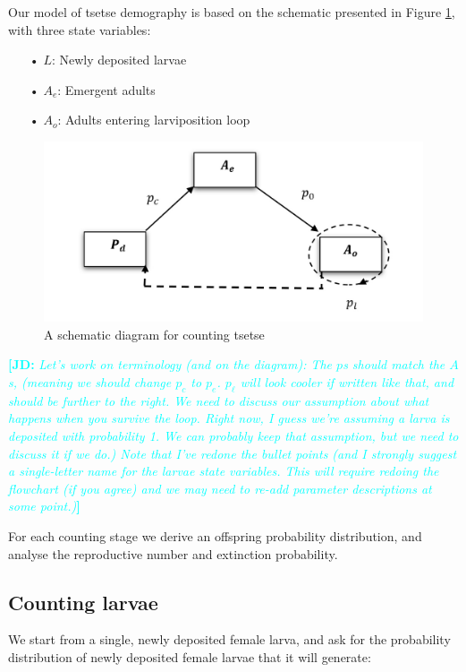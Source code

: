 \documentclass[smallextended]{svjour3}
\newcommand{\comment}[3]{\textcolor{#1}{\textbf{[#2: }\textit{#3}\textbf{]}}}
\newcommand{\jd}[1]{\comment{cyan}{JD}{#1}}
\begin{document}
Our model of tsetse demography is based on the schematic presented in Figure \ref{fig:flowchart}, with three state variables:

\begin{itemize}
\item[•] $L$: Newly deposited larvae
\item[•] $A_{e}$: Emergent adults
\item[•] $A_{o}$: Adults entering larviposition loop
\end{itemize}
\begin{figure}[hbt!]
	\centering
	\includegraphics[width=0.7\linewidth]{Tsetseflowchat3.png}
	\caption{A schematic diagram for counting tsetse}
	\label{fig:flowchart}
\end{figure}

\jd{Let's work on terminology (and on the diagram): The $p$s should match the $A$s, (meaning we should change $p_c$ to $p_e$. $p_\ell$ will look cooler if written like that, and should be further to the right. We need to discuss our assumption about what happens when you survive the loop. Right now, I guess we're assuming a larva is deposited with probability 1. We can probably keep that assumption, but we need to discuss it if we do.) Note that I've redone the bullet points (and I strongly suggest a single-letter name for the larvae state variables. This will require redoing the flowchart (if you agree) and we may need to re-add parameter descriptions at some point.)}

For each counting stage we derive an offspring probability distribution, and analyse the reproductive number and extinction probability.    

\subsection{Counting larvae}

We start from a single, newly deposited female larva, and ask for the probability distribution of newly deposited female larvae that it will generate:
\end{document}
